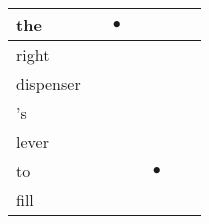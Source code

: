 \documentclass[landscape]{article}
\newcommand{\ssp}{\hspace{2pt}}
\newcommand{\mex}{\cellcolor{g}$\bullet$}
\begin{document}
\begin{tabular}{|l|p{10pt}|p{10pt}|p{10pt}|p{10pt}|p{10pt}|p{10pt}|}
\hline
\ssp \cellcolor{ref1}the \ssp&\hspace{2pt}&\hspace{2pt}\mex&\hspace{2pt}&\hspace{2pt}&\hspace{2pt}&\hspace{2pt}\\
\hline
\ssp right \ssp&\hspace{2pt}&\hspace{2pt}&\hspace{2pt}&\hspace{2pt}&\hspace{2pt}&\hspace{2pt}\\
\hline
\ssp dispenser \ssp&\hspace{2pt}&\hspace{2pt}&\hspace{2pt}&\hspace{2pt}&\hspace{2pt}&\hspace{2pt}\\
\hline
\ssp 's \ssp&\hspace{2pt}&\hspace{2pt}&\hspace{2pt}&\hspace{2pt}&\hspace{2pt}&\hspace{2pt}\\
\hline
\ssp lever \ssp&\hspace{2pt}&\hspace{2pt}&\hspace{2pt}&\hspace{2pt}&\hspace{2pt}&\hspace{2pt}\\
\hline
\ssp \cellcolor{ref3}to \ssp&\hspace{2pt}&\hspace{2pt}&\hspace{2pt}&\hspace{2pt}\mex&\hspace{2pt}&\hspace{2pt}\\
\hline
\ssp fill \ssp&\hspace{2pt}&\hspace{2pt}&\hspace{2pt}&\hspace{2pt}&\hspace{2pt}&\hspace{2pt}\\

\end{tabular}
\end{document}
